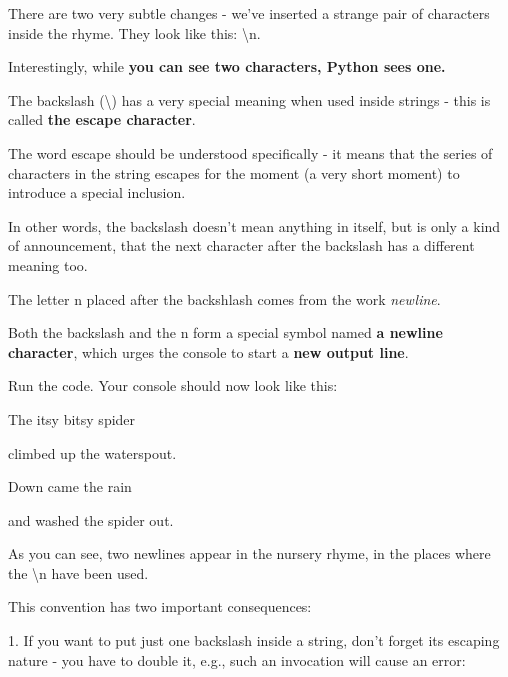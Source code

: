 \documentclass[a4paper,10pt]{article}
\begin{document}
There are two very subtle changes - we've inserted a strange pair of characters inside the rhyme. They look like this: {\selectfont \textbackslash n}.
\newline

Interestingly, while \textbf{you can see two characters, Python sees one.}
\newline

The backslash ({\selectfont \textbackslash }) has a very special meaning when used inside strings - this is called \textbf{the escape character}.
\newline

The word escape should be understood specifically - it means that the series of characters in the string escapes for the moment (a very short moment) to introduce a special inclusion.
\newline

In other words, the backslash doesn't mean anything in itself, but is only a kind of announcement, that the next character after the backslash has a different meaning too.
\newline

The letter {\selectfont n} placed after the backshlash comes from the work \textit{newline}.
\newline

Both the backslash and the {\selectfont n} form a special symbol named \textbf{a newline character}, which urges the console to start a \textbf{new output line}.
\newline

Run the code. Your console should now look like this:
\newline

{\selectfont The itsy bitsy spider

climbed up the waterspout.
\newline

Down came the rain

and washed the spider out.}


As you can see, two newlines appear in the nursery rhyme, in the places where the {\selectfont \textbackslash n} have been used.
\newline

This convention has two important consequences:
\newline

1. If you want to put just one backslash inside a string, don't forget its escaping nature - you have to double it, e.g., such an invocation will cause an error:
\newline
\end{document}
